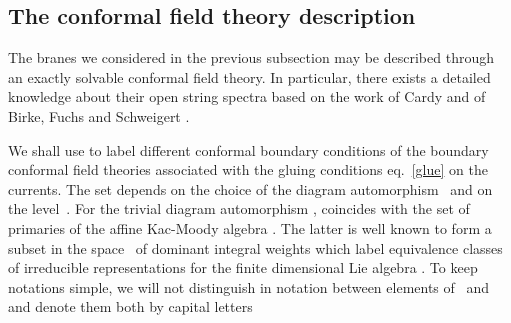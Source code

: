 \documentclass[12pt,a4paper]{article}
\providecommand{\mf}{\mathfrak} %
\providecommand{\mc}{\mathcal} %
\def\bL{\mc{B}} %
\def\areps{P_k^+} %
\def\reps{P^+} %
\def\tareps{\bL^\omega_k} %
\def\asg{{\hat{\mf{g}}}}
\def\id{{\rm id}}
\begin{document}
\subsection{\label{sc:CFT}The conformal field theory description}

  The branes we considered in the previous subsection may be described
through an exactly solvable conformal field theory. In particular, 
there exists a detailed knowledge about their open string spectra
based on the work of Cardy \cite{Cardy:1989ir} and of Birke, Fuchs 
and Schweigert \cite{Birke:1999ik}. 
\medskip

We shall use \myHighlight{$\alpha,\beta,\ldots\in\tareps$}\coordHE{} to label
different conformal boundary conditions of the boundary conformal 
field theories associated with the gluing conditions eq.~\eqref{glue}
on the currents. The set \myHighlight{$\tareps$}\coordHE{} depends on the choice of the diagram
automorphism~\myHighlight{$\omega$}\coordHE{} and on the level~\coordHE{}. For the trivial diagram
automorphism \myHighlight{$\omega=\id$}\coordHE{}, \myHighlight{$\bL^\id_k = \areps$}\coordHE{} coincides with
the set of primaries of the affine Kac-Moody algebra \myHighlight{$\asg_k$}\coordHE{}. 
The latter is well known to form a subset in the space~\myHighlight{$\reps$}\coordHE{} 
of dominant integral weights which label equivalence classes of 
irreducible representations for the finite dimensional 
Lie algebra \myHighlight{$\mf{g}$}\coordHE{}. To keep notations simple, we will not 
distinguish in notation between elements of~\myHighlight{$\reps$}\coordHE{} and~\myHighlight{$\areps$}\coordHE{}
and denote them both by capital letters \coordHE{}
\end{document}

